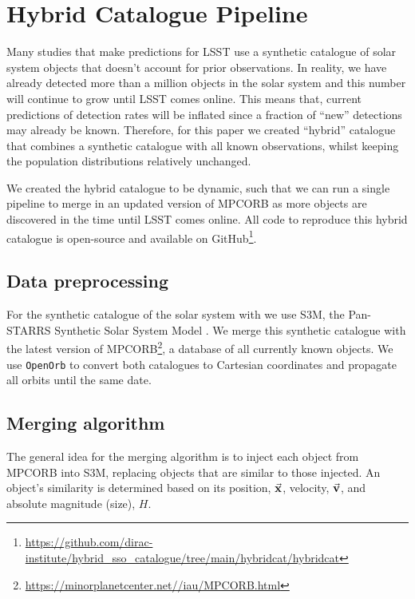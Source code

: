 \documentclass[twocolumn]{aastex631}
\newcommand{\sss}{S3M}
\newcommand{\mpco}{MPCORB}
\begin{document}
\restartappendixnumbering

\allowdisplaybreaks
\appendix

\section{Hybrid Catalogue Pipeline}\label{app:hybrid}
Many studies that make predictions for LSST use a synthetic catalogue of solar system objects that doesn't account for prior observations. In reality, we have already detected more than a million objects in the solar system and this number will continue to grow until LSST comes online. This means that, current predictions of detection rates will be inflated since a fraction of ``new'' detections may already be known. Therefore, for this paper we created ``hybrid'' catalogue that combines a synthetic catalogue with all known observations, whilst keeping the population distributions relatively unchanged.

We created the hybrid catalogue to be dynamic, such that we can run a single pipeline to merge in an updated version of \mpco{} as more objects are discovered in the time until LSST comes online. All code to reproduce this hybrid catalogue is open-source and available on GitHub\footnote{\url{https://github.com/dirac-institute/hybrid_sso_catalogue/tree/main/hybridcat/hybridcat}}.

\subsection{Data preprocessing}
For the synthetic catalogue of the solar system with we use \sss{}, the Pan-STARRS Synthetic Solar System Model \citep[\sss{}][]{Grav+2011}. We merge this synthetic catalogue with the latest version of \mpco{}\footnote{\url{https://minorplanetcenter.net//iau/MPCORB.html}}, a database of all currently known objects. We use \texttt{OpenOrb} \citep{Granvik+2009} to convert both catalogues to Cartesian coordinates and propagate all orbits until the same date.

\subsection{Merging algorithm}
The general idea for the merging algorithm is to inject each object from \mpco{} into \sss{}, replacing objects that are similar to those injected. An object's similarity is determined based on its position, $\va{x}$, velocity, $\va{v}$, and absolute magnitude (size), ${H}$.
\end{document}
